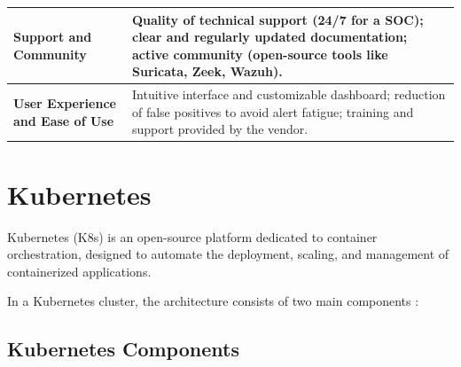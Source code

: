 \begin{table}[H]
\begin{tabular}{>{\raggedright\arraybackslash}p{3cm} p{10.5cm}}
\midrule
\textbf{Support and Community} & Quality of technical support (24/7 for a SOC); clear and regularly updated documentation; active community (open-source tools like Suricata, Zeek, Wazuh). \\
\midrule
\textbf{User Experience and Ease of Use} & Intuitive interface and customizable dashboard; reduction of false positives to avoid alert fatigue; training and support provided by the vendor. \\
\bottomrule
\end{tabular}
\end{table}


\section{Kubernetes}
\label{sec:kubernetes}

Kubernetes (K8s) is an open-source platform dedicated to container orchestration, designed to automate the deployment, scaling, and management of containerized applications.

In a Kubernetes cluster, the architecture consists of two main components \cite{k8s-docs}:

\subsection{Kubernetes Components}
\label{subsec:k8s-components}

